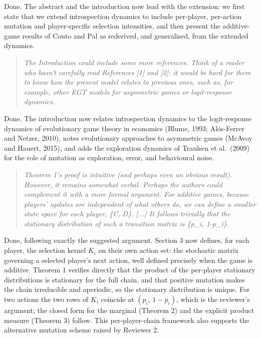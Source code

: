 \documentclass[11pt]{article}
\newenvironment{reviewerquote}
  {\begin{quote}\itshape}
  {\end{quote}}
\begin{document}
Done. The abstract and the introduction now lead with the extension: we
first state that we extend introspection dynamics to include per-player,
per-action mutation and player-specific selection intensities, and then
present the additive-game results of Couto and Pal as rederived, and
generalised, from the extended dynamics.

\begin{reviewerquote}
The Introduction could include some more references. Think of a reader who
hasn't carefully read References [1] and [2]: it would be hard for them to
know how the present model relates to previous ones, such as, for example,
other EGT models for asymmetric games or logit-response dynamics.
\end{reviewerquote}

Done. The introduction now relates introspection dynamics to the
logit-response dynamics of evolutionary game theory in economics (Blume,
1993; Al\'os-Ferrer and Netzer, 2010), notes evolutionary approaches to
asymmetric games (McAvoy and Hauert, 2015), and adds the exploration
dynamics of Traulsen et al.\ (2009) for the role of mutation as
exploration, error, and behavioural noise.

\begin{reviewerquote}
Theorem 1's proof is intuitive (and perhaps even an obvious result). However,
it remains somewhat verbal. Perhaps the authors could complement it with a
more formal argument. For additive games, because players' updates are
independent of what others do, we can define a smaller state space for each
player, \{C, D\}. [...] It follows trivially that the stationary distribution
of such a transition matrix is \{p\_i, 1-p\_i\}.
\end{reviewerquote}

Done, following exactly the suggested argument. Section 3 now defines, for
each player, the selection kernel \(K_i\) on their own action set: the
stochastic matrix governing a selected player's next action, well defined
precisely when the game is additive. Theorem 1 verifies directly that the
product of the per-player stationary distributions is stationary for the
full chain, and that positive mutation makes the chain irreducible and
aperiodic, so the stationary distribution is unique. For two actions the two
rows of \(K_i\) coincide at \((p_i,\,1-p_i)\), which is the reviewer's
argument; the closed form for the marginal (Theorem 2) and the explicit
product measure (Theorem 3) follow. This per-player-chain framework also
supports the alternative mutation scheme raised by Reviewer 2.
\end{document}
